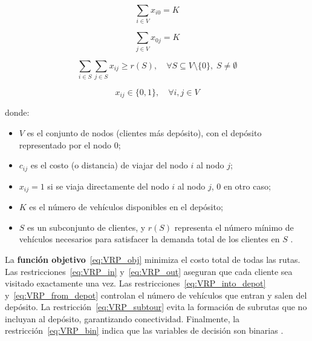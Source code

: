 \documentclass[12pt,titlepage,twoside,openright]{book}
\begin{document}
\begin{equation}
	\sum_{i \in V} x_{i0} = K
	\label{eq:VRP_into_depot}
\end{equation}

\begin{equation}
	\sum_{j \in V} x_{0j} = K
	\label{eq:VRP_from_depot}
\end{equation}

\begin{equation}
	\sum_{i \in S} \sum_{j \in S} x_{ij} \geq r(S), \quad \forall S \subseteq V \setminus \{0\},\; S \neq \emptyset
	\label{eq:VRP_subtour}
\end{equation}

\begin{equation}
	x_{ij} \in \{0, 1\}, \quad \forall i,j \in V
	\label{eq:VRP_bin}
\end{equation}
\medskip

\noindent donde:
\begin{itemize}
	\item \(V\) es el conjunto de nodos (clientes más depósito), con el depósito representado por el nodo 0;
	\item \(c_{ij}\) es el costo (o distancia) de viajar del nodo \(i\) al nodo \(j\);
	\item \(x_{ij} = 1\) si se viaja directamente del nodo \(i\) al nodo \(j\), 0 en otro caso;
	\item \(K\) es el número de vehículos disponibles en el depósito;
	\item \(S\) es un subconjunto de clientes, y \(r(S)\) representa el número mínimo de vehículos necesarios para satisfacer la demanda total de los clientes en \(S\) \citep{toth2014}.
\end{itemize}

La \textbf{función objetivo}~\eqref{eq:VRP_obj} minimiza el costo total de todas las rutas. Las restricciones~\eqref{eq:VRP_in} y~\eqref{eq:VRP_out} aseguran que cada cliente sea visitado exactamente una vez. Las restricciones~\eqref{eq:VRP_into_depot} y~\eqref{eq:VRP_from_depot} controlan el número de vehículos que entran y salen del depósito. La restricción~\eqref{eq:VRP_subtour} evita la formación de subrutas que no incluyan al depósito, garantizando conectividad. Finalmente, la restricción~\eqref{eq:VRP_bin} indica que las variables de decisión son binarias \citep{toth2014}.
\end{document}
